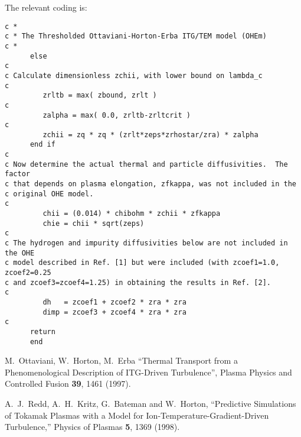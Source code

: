 The relevant coding is:
\begin{verbatim}
c *
c * The Thresholded Ottaviani-Horton-Erba ITG/TEM model (OHEm)
c *
      else
c
c Calculate dimensionless zchii, with lower bound on lambda_c
c
         zrltb = max( zbound, zrlt )
c
         zalpha = max( 0.0, zrltb-zrltcrit )
c
         zchii = zq * zq * (zrlt*zeps*zrhostar/zra) * zalpha
      end if
c
c Now determine the actual thermal and particle diffusivities.  The factor
c that depends on plasma elongation, zfkappa, was not included in the 
c original OHE model.
c
         chii = (0.014) * chibohm * zchii * zfkappa
         chie = chii * sqrt(zeps)
c
c The hydrogen and impurity diffusivities below are not included in the OHE
c model described in Ref. [1] but were included (with zcoef1=1.0, zcoef2=0.25
c and zcoef3=zcoef4=1.25) in obtaining the results in Ref. [2].
c
         dh   = zcoef1 + zcoef2 * zra * zra
         dimp = zcoef3 + zcoef4 * zra * zra
c
      return
      end
\end{verbatim}

\begin{thebibliography}{99}

M.~Ottaviani, W.~Horton, M.~Erba
``Thermal Transport from a Phenomenological Description of ITG-Driven
Turbulence'',
Plasma Physics and Controlled Fusion {\bf 39}, 1461 (1997).

A.~J.~Redd, A.~H.~Kritz, G.~Bateman and W.~Horton,
``Predictive Simulations of Tokamak Plasmas with a Model for
Ion-Temperature-Gradient-Driven Turbulence,''
Physics of Plasmas {\bf 5}, 1369 (1998).

\end{thebibliography}
















